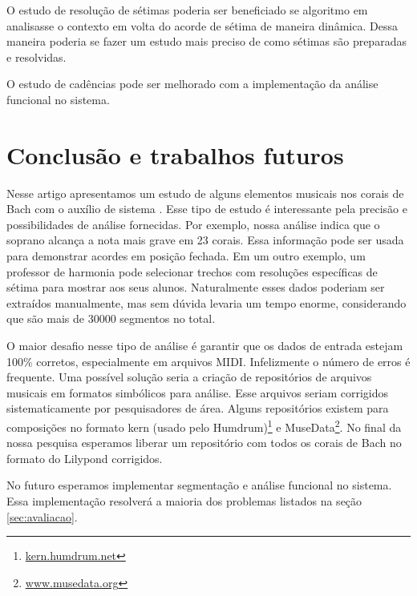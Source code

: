 O estudo de resolução de sétimas poderia ser beneficiado se algoritmo
em \rameau{} analisasse o contexto em volta do acorde de sétima de
maneira dinâmica. Dessa maneira poderia se fazer um estudo mais
preciso de como sétimas são preparadas e resolvidas. 

O estudo de cadências pode ser melhorado com a implementação da
análise funcional no sistema. 

\section{Conclusão e trabalhos futuros}
\label{sec:concl-e-trab}

Nesse artigo apresentamos um estudo de alguns elementos musicais nos
corais de Bach com o auxílio de sistema \rameau{}. Esse tipo de estudo
é interessante pela precisão e possibilidades de análise fornecidas.
Por exemplo, nossa análise indica que o soprano alcança a nota mais
grave em 23 corais. Essa informação pode ser usada para demonstrar
acordes em posição fechada. Em um outro exemplo, um professor de
harmonia pode selecionar trechos com resoluções específicas de sétima
para mostrar aos seus alunos. Naturalmente esses dados poderiam ser
extraídos manualmente, mas sem dúvida levaria um tempo enorme,
considerando que são mais de 30000 segmentos no total.

O maior desafio nesse tipo de análise é garantir que os dados de
entrada estejam 100\% corretos, especialmente em arquivos MIDI.
Infelizmente o número de erros é frequente. Uma possível solução seria
a criação de repositórios de arquivos musicais em formatos simbólicos
para análise. Esse arquivos seriam corrigidos sistematicamente por
pesquisadores de área. Alguns repositórios existem para composições no
formato kern (usado pelo Humdrum)\footnote{\url{kern.humdrum.net}} e
MuseData\footnote{\url{www.musedata.org}}. No final da nossa pesquisa
esperamos liberar um repositório com todos os corais de Bach no
formato do Lilypond corrigidos.

No futuro esperamos implementar segmentação e análise funcional no
sistema. Essa implementação resolverá a maioria dos problemas listados
na seção \ref{sec:avaliacao}.

